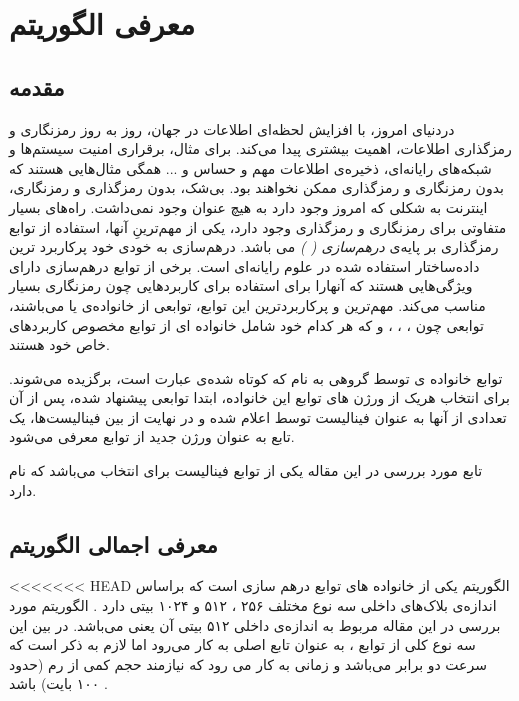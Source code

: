 \chapter{معرفی الگوریتم
}
\section{
	مقدمه
}
دردنیای امروز، با افزایش لحظه‌ای اطلاعات در جهان، روز‌ به ‌روز رمزنگاری و رمزگذاری اطلاعات، اهمیت بیشتری پیدا می‌کند. برای مثال، برقراری امنیت سیستم‌ها و شبکه‌های رایانه‌ای، ذخیره‌ی اطلاعات مهم و حساس و ... همگی مثال‌هایی هستند که بدون رمزنگاری و رمزگذاری ممکن نخواهند بود. بی‌شک، بدون رمزگذاری و رمزنگاری، اینترنت به شکلی که امروز وجود دارد به هیچ عنوان وجود نمی‌داشت.
راه‌های بسیار متفاوتی برای رمزنگاری و رمزگذاری وجود دارد، یکی از مهم‌ترینِ آنها، استفاده از توابع رمزگذاری بر پایه‌ی
\textit{ 
	درهم‌سازی (
	)
}
می باشد. درهم‌سازی به خودی خود پرکاربرد ترین داده‌ساختار استفاده شده در علوم رایانه‌ای است. برخی از توابع درهم‌سازی دارای ویژگی‌هایی هستند که آنهارا برای استفاده برای کاربرد‌هایی چون رمزنگاری بسیار مناسب می‌کند. مهم‌ترین و پرکاربردترین این توابع، توابعی از خانواده‌ی 
\textit{}
یا 
\textit{}
می‌باشند، توابعی چون 
،
،
،
و 
که هر کدام خود شامل خانواده ای از توابع مخصوص کاربرد‌های خاص خود هستند.

توابع خانواده ی 
توسط گروهی به نام 
\textit{}
که کوتاه شده‌ی عبارت
\textit{}
است، برگزیده می‌شوند. برای انتخاب هریک از ورژن های توابع این خانواده، ابتدا توابعی پیشنهاد شده، پس از آن تعدادی از آنها به عنوان فینالیست توسط 
اعلام شده و در نهایت از بین فینالیست‌ها، یک تابع به عنوان ورژن جدید از توابع 
معرفی می‌شود.

تابع مورد بررسی در این مقاله یکی از توابع فینالیست برای انتخاب 
می‌باشد که 
نام دارد. 

\section{
	معرفی اجمالی الگوریتم
}
<<<<<<< HEAD
الگوریتم 
\textit{ }
  یکی از خانواده های توابع درهم سازی است که  بر‌اساس اندازه‌ی بلاک‌های داخلی سه نوع مختلف ۲۵۶ ، ۵۱۲  و ۱۰۲۴ بیتی دارد  .
  الگوریتم مورد بررسی در این مقاله مربوط به اندازه‌ی داخلی ۵۱۲ بیتی آن یعنی
  می‌باشد. در بین این سه نوع کلی از توابع
  ،
 به عنوان تابع اصلی به کار می‌رود اما لازم به ذکر است که سرعت 
دو برابر
 می‌باشد و 
 زمانی به کار می رود که نیازمند حجم کمی از رم  (حدود ۱۰۰ بایت) باشد .
 
